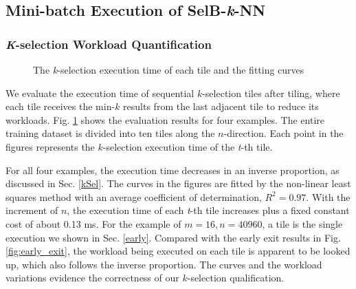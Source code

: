 \subsection{Mini-batch Execution of SelB-\textit{k}-NN}

\subsubsection{\textit{K}-selection Workload Quantification}

\begin{figure}[tbp]
    \caption{The \textit{k}-selection execution time of each tile and the fitting curves}
    \label{fig:verified}
    \end{figure}

We evaluate the execution time of sequential $k$-selection tiles after tiling, where each tile receives the min-$k$ results from the last adjacent tile to reduce its workloads. Fig. \ref{fig:verified} shows the evaluation results for four examples. The entire training dataset is divided into ten tiles along the $n$-direction. Each point in the figures represents the $k$-selection execution time of the \textit{t}-th tile.

For all four examples, the execution time decreases in an inverse proportion, as discussed in Sec. \ref{kSel}. The curves in the figures are fitted by the non-linear least squares method with an average coefficient of determination, $R^{2} = 0.97$. With the increment of $n$, the execution time of each \textit{t}-th tile increases plus a fixed constant cost of about 0.13 ms. For the example of $m = 16, n = 40960$, a tile is the single execution we shown in Sec. \ref{early}. Compared with the early exit results in Fig. \ref{fig:early_exit}, the workload being executed on each tile is apparent to be looked up, which also follows the inverse proportion. The curves and the workload variations evidence the correctness of our $k$-selection qualification.

